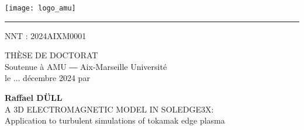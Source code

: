 \chead{}
\thispagestyle{empty}

\vspace{1em}

\begin{center}
	\begin{minipage}[c]{.5\linewidth}
		\raggedright\texttt{[image: logo\_amu]}
	\end{minipage}\hfill
	\begin{minipage}[c]{.5\linewidth}
	\end{minipage}\hfill
\end{center}


\begin{center}
	\begin{minipage}[c]{.77\linewidth}
		\textcolor{yellowamu}{\noindent\rule{\textwidth}{4pt}}
	\end{minipage}\hfill
	\begin{minipage}[c]{.23\linewidth}
		\raggedleft\textsf{NNT : 2024AIXM0001}
	\end{minipage}\hfill
\end{center}


\doublespacing
\begin{flushleft}
    \textsf{\HUGE\textcolor{blueamu}{THÈSE DE DOCTORAT}}\\
	\textsf{\Large Soutenue à AMU ― Aix-Marseille Université}\\
	\textsf{\Large le ... décembre 2024 par}\\
\end{flushleft}
\vspace{1.5em}
\begin{center}
	\textsf{\textbf{\Huge Raffael DÜLL}}\\
    \vspace{1em}
	\textsf{\LARGE A 3D ELECTROMAGNETIC MODEL IN SOLEDGE3X:}\\ 
	\textsf{\Large Application to turbulent simulations of tokamak edge plasma}\\
\end{center}
\singlespacing

